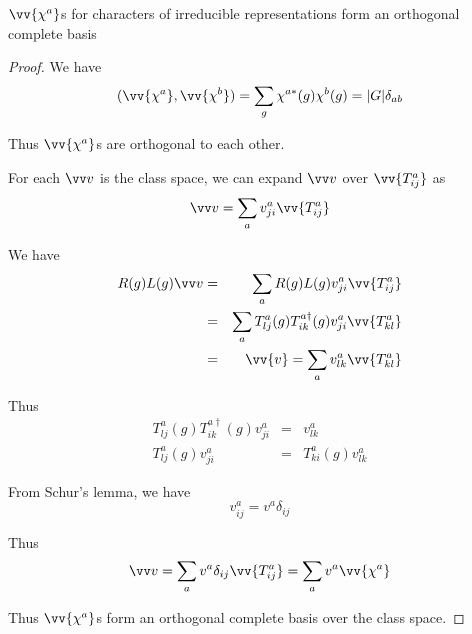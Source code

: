 \documentclass[12pt]{book}
\begin{document}
	\begin{lemma}
		$\vv {\chi^a}$s for characters of irreducible representations form an orthogonal complete basis
	\end{lemma}
	\begin{proof}
	We have
	\begin{eqnarray}
		(\vv{\chi^a},\vv{\chi^b})=\sum_g\chi^{a*}(g)\chi^b(g)=|G|\delta_{ab}
	\end{eqnarray}
	
	Thus $\vv{\chi^a}$s are orthogonal to each other.
	
	For each $\vv v$ is the class space, we can expand  $\vv v$ over $\vv{T_{ij}^a}$ as
	\begin{equation}
		\vv v=\sum_av^a_{ji}\vv{T_{ij}^a}
	\end{equation}	
	
	We have
	\begin{eqnarray}
		R(g)L(g)\vv v&=&\sum_aR(g)L(g)v^a_{ji}\vv{T_{ij}^a}\\
		&=&\sum_aT_{lj}^a(g)T_{ik}^{a\dagger}(g)v^a_{ji}\vv{T_{kl}^a}\\
		&=&\vv{v}=\sum_av^a_{lk}\vv{T_{kl}^a}
	\end{eqnarray}
	
	Thus
	\begin{eqnarray}
		T_{lj}^a(g)T_{ik}^{a\dagger}(g)v^a_{ji}&=&v^a_{lk}\\
		T_{lj}^a(g)v^a_{ji}&=&T_{ki}^a(g)v^a_{lk}
	\end{eqnarray}
	
	From Schur's lemma, we have
	\begin{equation}
		v^a_{ij}=v^a\delta_{ij}
	\end{equation}
	
	Thus
	\begin{equation}
		\vv v=\sum_av^a\delta_{ij}\vv{T_{ij}^a}=\sum_av^a\vv{\chi^a}
	\end{equation}	
	
	Thus $\vv{\chi^a}$s form an orthogonal complete basis over the class space.
	\end{proof}
	
\end{document}
